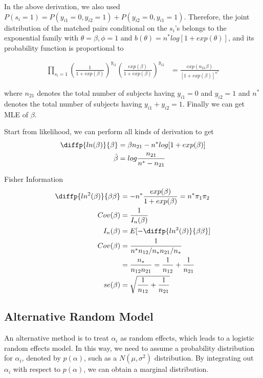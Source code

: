 \documentclass[11pt]{article} %
\begin{document}
	In the above derivation, we also used $P(s_i = 1) = P(y_{i1} = 0, y_{i2} = 1) +	P(y_{i2} = 0, y_{i1} = 1)$. Therefore, the joint distribution of the matched pairs	conditional on the $s_i$’s belongs to the exponential family with $\theta = \beta, \phi = 1$ and $b(\theta) = n^{\ast} log[1+exp(\theta)]$, and its probability function is proportional to
	
	\begin{align*}
		\prod_{s_i =1} \left(\frac{1}{1 + exp(\beta)} \right)^{y_{i1}} \left(\frac{exp(\beta)}{1 + exp(\beta)} \right)^{y_{i2}} &= \frac{exp(n_{21} \beta)}{[1+ exp(\beta)]^{n^{\ast}}}
	\end{align*}

where $n_{21}$ denotes the total number of subjects having $y_{i1} = 0$ and $y_{i2} = 1$ and $n^{\ast}$ denotes the total number of subjects having $y_{i1} + y_{i2} = 1$. Finally we can get MLE of $\beta$.

Start from likelihood, we can perform all kinds of derivation to get 
\begin{align*}
	\diffp{ln(\beta)}{\beta} &= \beta n_{21} - n^{\ast} log[1+ exp(\beta)]\\
	\hat{\beta} &= log \frac{n_{21}}{n^{\ast} - n_{21}}
\end{align*}

Fisher Information
\begin{align*}
	\diffp{ln^2(\beta)}{\beta \beta} &= -n^{\ast} \frac{exp(\beta)}{1+ exp(\beta)} = n^{\ast} \pi_1 \pi_2\\
	Cov(\beta) &= \frac{1}{I_n(\beta)} \\
	I_n(\beta) &= E[- \diffp{ln^2(\beta)}{\beta \beta}]\\
	Cov(\beta) &= \frac{1}{n^{\ast} n_{12}/n_{\ast} n_{21}/n_{\ast}}\\
	&= \frac{n_{\ast}}{n_{12} n_{21}} = \frac{1}{n_{12}} + \frac{1}{n_{21}}\\
	se(\beta) &= \sqrt{\frac{1}{n_{12}} + \frac{1}{n_{21}}}
\end{align*}



\subsection{Alternative Random Model}

An alternative method is to treat ${\alpha_i}$ as random effects, which leads to a logistic random effects model. In this way, we need to assume a probability distribution for  $\alpha_i$, denoted by $p(\alpha)$, such as a $N(\mu, \sigma^2)$ distribution. By integrating out $\alpha_i$ with respect to $p(\alpha)$, we can obtain a marginal distribution.
\end{document}
